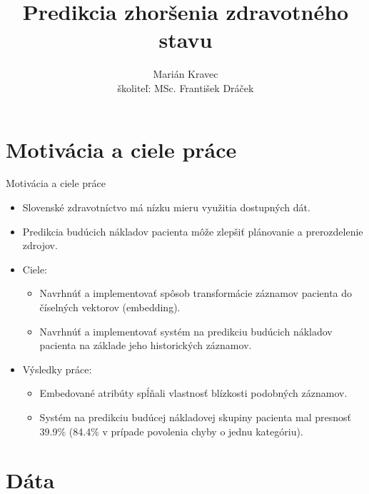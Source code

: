 \documentclass[slovak,10pt]{beamer}
\title[Predikcia zhoršenia zdravotného stavu]{Predikcia zhoršenia zdravotného stavu}
\author[]{Marián Kravec \\ školiteľ: MSc. František Dráček }
\date{}
\begin{document}
\begin{frame}
  \titlepage
\end{frame}




\section{Motivácia a ciele práce}

\begin{frame}{Motivácia a ciele práce}
	\begin{itemize}
		\item<1> Slovenské zdravotníctvo má nízku mieru využitia dostupných dát.
		\item<1> Predikcia budúcich nákladov pacienta môže zlepšiť plánovanie a prerozdelenie zdrojov.
		\item<1> Ciele:
		\begin{itemize}
			\item<1> Navrhnúť a implementovať spôsob transformácie záznamov pacienta do číselných vektorov (embedding).
			\item<1> Navrhnúť a implementovať systém na predikciu budúcich nákladov pacienta na základe jeho historických záznamov.
		\end{itemize}
		\item<1> Výsledky práce:
		\begin{itemize}
			\item<1> Embedované atribúty spĺňali vlastnosť blízkosti podobných záznamov.
			\item<1> Systém na predikciu budúcej nákladovej skupiny pacienta mal presnosť 39.9\% (84.4\% v prípade povolenia chyby o jednu kategóriu).
		\end{itemize}
	\end{itemize}
\end{frame}


\section{Dáta}
\end{document}
